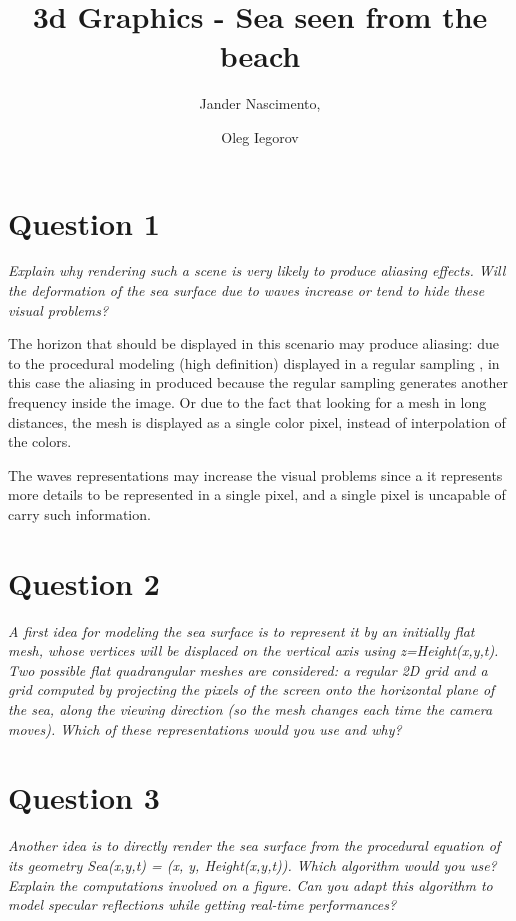 \documentclass{report}
\begin{document}
\title{3d Graphics - Sea seen from the beach}

\author{Jander Nascimento, 
\and Oleg Iegorov}

\maketitle

\section{Question 1}

\emph{Explain why rendering such a scene is very likely to produce aliasing effects. Will the
deformation of the sea surface due to waves increase or tend to hide these visual problems?}

The horizon that should be displayed in this scenario may produce aliasing: due to the procedural modeling (high definition) displayed in a regular sampling \cite{iaow}, in this case the aliasing in produced because the regular sampling generates another frequency inside the image. Or due to the fact that looking for a mesh in long distances, the mesh is displayed as a single color pixel, instead of interpolation of the colors. 

The waves representations may increase the visual problems since a it represents more details to be represented in a single pixel, and a single pixel is uncapable of carry such information. 

\section{Question 2}

\emph{A first idea for modeling the sea surface is to represent it by an initially flat mesh, whose
vertices will be displaced on the vertical axis using z=Height(x,y,t). Two possible flat
quadrangular meshes are considered: a regular 2D grid and a grid computed by projecting the
pixels of the screen onto the horizontal plane of the sea, along the viewing direction (so the
mesh changes each time the camera moves). Which of these representations would you use
and why?}

\section{Question 3}

\emph{Another idea is to directly render the sea surface from the procedural equation of its
geometry Sea(x,y,t) = (x, y, Height(x,y,t)). Which algorithm would you use? Explain the
computations involved on a figure. Can you adapt this algorithm to model specular
reflections while getting real-time performances?}
\end{document}
